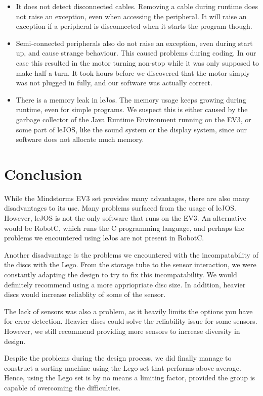 \documentclass[a4paper,oneside,11pt]{article}
\begin{document}
\begin{itemize}
\begin{itemize}
            \item It does not detect disconnected cables. Removing a cable during runtime does not raise an exception, even when accessing the peripheral. It will raise an exception if a peripheral is disconnected when it starts the program though.
            \item Semi-connected peripherals also do not raise an exception, even during start up, and cause strange behaviour. This caused problems during coding. In our case this resulted in the motor turning non-stop while it was only supposed to make half a turn. It took hours before we discovered that the motor simply was not plugged in fully, and our software was actually correct. 
            \item There is a memory leak in leJos. The memory usage keeps growing during runtime, even for simple programs. We suspect this is either caused by the garbage collector of the Java Runtime Environment running on the EV3, or some part of leJOS, like the sound system or the display system, since our software does not allocate much memory.
    	\end{itemize}
\end{itemize}

\section{Conclusion}
While the Mindstorms EV3 set provides many advantages, there are also many disadvantages to its use. Many problems surfaced from the usage of leJOS. However, leJOS is not the only software that runs on the EV3. An alternative would be RobotC, which runs the C programming language, and perhaps the problems we encountered using leJos are not present in RobotC. 

Another disadvantage is the problems we encountered with the incompatability of the discs with the Lego. From the storage tube to the sensor interaction, we were constantly adapting the design to try to fix this incompatability. We would definitely recommend using a more appriopriate disc size. In addition, heavier discs would increase reliablity of some of the sensor.

The lack of sensors was also a problem, as it heavily limits the options you have for error detection. Heavier discs could solve the reliability issue for some sensors. However, we still recommend providing more sensors to increase diversity in design.
 
Despite the problems during the design process, we did finally manage to construct a sorting machine using the Lego set that performs above average. Hence, using the Lego set is by no means a limiting factor, provided the group is capable of overcoming the difficulties.
\end{document}
